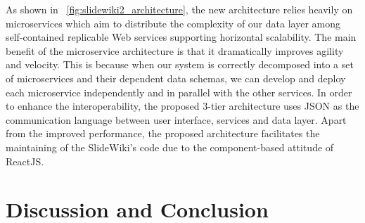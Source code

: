 \documentclass[ngerman,UKenglish,table]{scrbook}
\begin{document}
As shown in ~\autoref{fig:slidewiki2_architecture}, the new architecture relies heavily on microservices which aim to distribute the complexity of our data layer among self-contained replicable Web services supporting horizontal scalability.
The main benefit of the microservice architecture is that it dramatically improves agility and velocity.
This is because when our system is correctly decomposed into a set of microservices and their dependent data schemas, we can develop and deploy each microservice independently and in parallel with the other services.
In order to enhance the interoperability, the proposed 3-tier architecture uses JSON as the communication language between user interface, services and data layer.
Apart from the improved performance, the proposed architecture facilitates the maintaining of the SlideWiki's code due to the component-based attitude of ReactJS.

%




 





\chapter{Discussion and Conclusion}
\label{chapter:conclusion}
\end{document}
